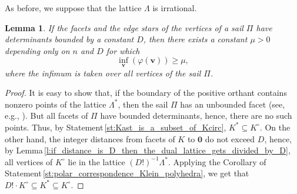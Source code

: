 \documentclass[11pt]{article}
\theoremstyle{definition}
\theoremstyle{remark}
\theoremstyle{plain}
\newtheorem{lemma}{Lemma}
\renewcommand{\vec}[1]{\mathbf{#1}}
\renewcommand{\geq}{\geqslant}
\newcommand{\sail}{\Pi}
\newcommand{\La}{\Lambda}
\begin{document}
  As before, we suppose that the lattice $\La$ is irrational.

  \begin{lemma} \label{l:positiveness_in_the_positive_orthant}
    If the facets and the edge stars of the vertices of a sail $\sail$ have determinants
    bounded by a constant $D$, then there exists a constant $\mu>0$ depending only on $n$
    and $D$ for which
    \[ \inf_{\vec v}(\varphi(\vec v))\geq\mu, \]
    where the infimum is taken over all vertices of the sail $\sail$.
  \end{lemma}

  \begin{proof}
    It is easy to show that, if the boundary of the positive orthant contains nonzero points
    of the lattice $\La^\ast$, then the sail $\sail$ has an unbounded facet (see, e.g.,
    \cite{german_norm_minima_I}). But all facets of $\sail$ have bounded determinants,
    hence, there are no such points. Thus, by Statement\,\ref{st:Kast_is_a_subset_of_Kcirc},
    $K^\ast\subseteq K^\circ$. On the other hand, the integer distances from facets of $K$ to
    $\vec 0$ do not exceed $D$, hence, by
    Lemma\,\ref{l:if_distance_is_D_then_the_dual_lattice_gets_divided_by_D}, all vertices of
    $K^\circ$ lie in the lattice $(D!)^{-1}\La^\ast$. Applying the Corollary of
    Statement\,\ref{st:polar_correspondence_Klein_polyhedra}, we get that
    $D!\cdot K^\circ\subseteq K^\ast\subseteq K^\circ$.


\end{proof}
\end{document}
